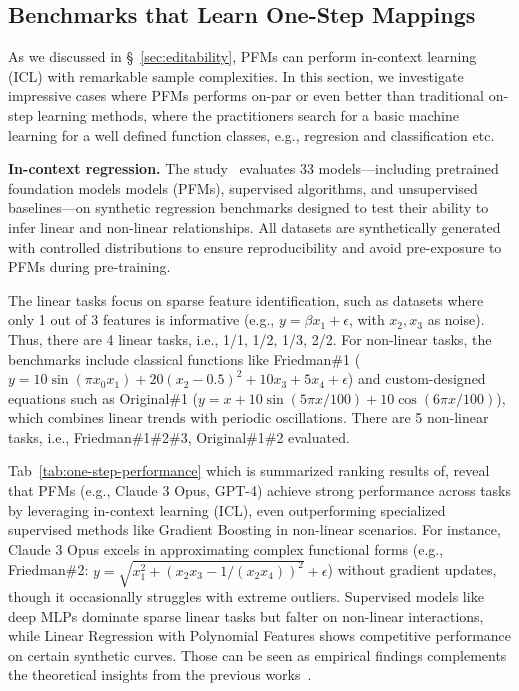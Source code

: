 \subsection{Benchmarks that Learn One-Step Mappings}

As we discussed in \S~\ref{sec:editability}, PFMs can perform in-context learning (ICL) with remarkable sample complexities. In this section, we investigate impressive cases where PFMs performs on-par or even better than traditional on-step learning methods, where the practitioners search for a basic machine learning for a well defined function classes, e.g., regresion and classification etc. 


\textbf{In-context regression.} The study~\cite{vacareanu2024words} evaluates 33 models—including pretrained foundation models models (PFMs), supervised algorithms, and unsupervised baselines—on synthetic regression benchmarks designed to test their ability to infer linear and non-linear relationships. All datasets are synthetically generated with controlled distributions to ensure reproducibility and avoid pre-exposure to PFMs during pre-training. 

The linear tasks focus on sparse feature identification, such as datasets where only 1 out of 3 features is informative (e.g., \( y = \beta x_1 + \epsilon \), with \( x_2, x_3 \) as noise). Thus, there are 4 linear tasks, i.e., 1/1, 1/2, 1/3, 2/2. For non-linear tasks, the benchmarks include classical functions like Friedman\#1 (\( y = 10\sin(\pi x_0x_1) + 20(x_2-0.5)^2 + 10x_3 + 5x_4 + \epsilon \)) and custom-designed equations such as Original\#1 (\( y = x + 10\sin(5\pi x/100) + 10\cos(6\pi x/100) \)), which combines linear trends with periodic oscillations. There are 5 non-linear tasks, i.e., Friedman\#1\#2\#3, Original\#1\#2 evaluated. 

Tab~\ref{tab:one-step-performance} which is summarized ranking results of, reveal that PFMs (e.g., Claude 3 Opus, GPT-4) achieve strong performance across tasks by leveraging in-context learning (ICL), even outperforming specialized supervised methods like Gradient Boosting in non-linear scenarios. For instance, Claude 3 Opus excels in approximating complex functional forms (e.g., Friedman\#2: \( y = \sqrt{x_1^2 + (x_2x_3 - 1/(x_2x_4))^2} + \epsilon \)) without gradient updates, though it occasionally struggles with extreme outliers. Supervised models like deep MLPs dominate sparse linear tasks but falter on non-linear interactions, while Linear Regression with Polynomial Features shows competitive performance on certain synthetic curves. Those can be seen as empirical findings complements the theoretical insights from the previous works~\cite{bai2024transformers, JeonLLR24, wang2024context, akyurek2022learning}.



